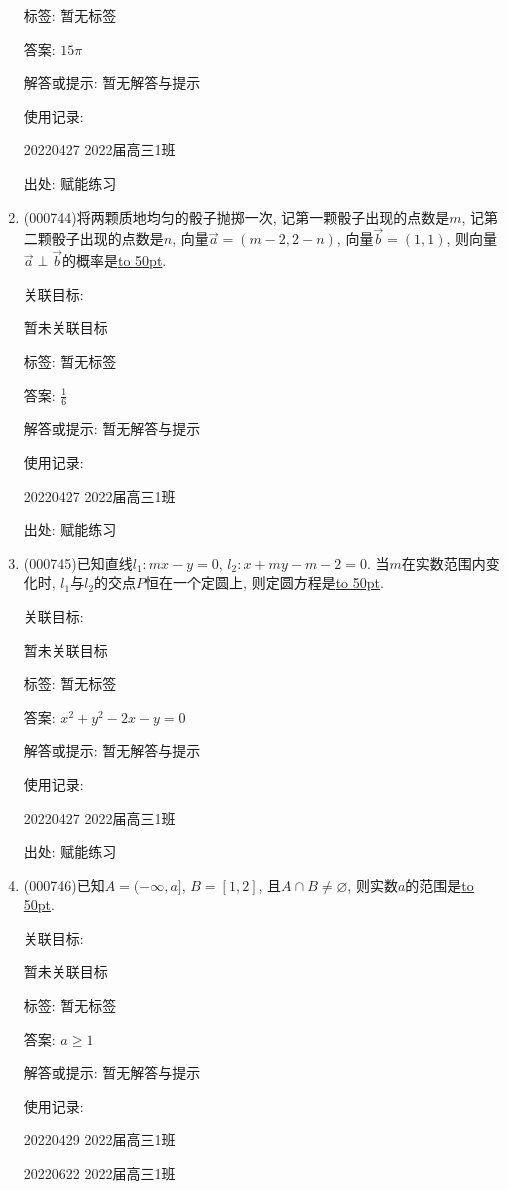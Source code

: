 \documentclass[10pt,a4paper]{article}
\newcommand{\blank}[1]{\underline{\hbox to #1pt{}}}
\begin{document}
\begin{enumerate}[1.]
标签: 暂无标签

答案: $15\pi$

解答或提示: 暂无解答与提示

使用记录:

20220427	2022届高三1班	


出处: 赋能练习
\item { (000744)}将两颗质地均匀的骰子抛掷一次, 记第一颗骰子出现的点数是$m$, 记第二颗骰子出现的点数是$n$, 向量$\overrightarrow a=(m-2,2-n)$, 向量$\overrightarrow b=(1,1)$, 则向量$\overrightarrow a\perp \overrightarrow b$的概率是\blank{50}.


关联目标:

暂未关联目标



标签: 暂无标签

答案: $\frac 16$

解答或提示: 暂无解答与提示

使用记录:

20220427	2022届高三1班	


出处: 赋能练习
\item { (000745)}已知直线$l_1:mx-y=0$, $l_2:x+my-m-2=0$. 当$m$在实数范围内变化时, $l_1$与$l_2$的交点$P$恒在一个定圆上, 则定圆方程是\blank{50}.


关联目标:

暂未关联目标



标签: 暂无标签

答案: $x^2+y^2-2x-y=0$

解答或提示: 暂无解答与提示

使用记录:

20220427	2022届高三1班	


出处: 赋能练习
\item { (000746)}已知$A=(-\infty,a]$, $B=[1,2]$, 且$A\cap B\ne \varnothing$, 则实数$a$的范围是\blank{50}.


关联目标:

暂未关联目标



标签: 暂无标签

答案: $a\ge 1$

解答或提示: 暂无解答与提示

使用记录:

20220429	2022届高三1班	

20220622	2022届高三1班  	



\end{enumerate}
\end{document}
